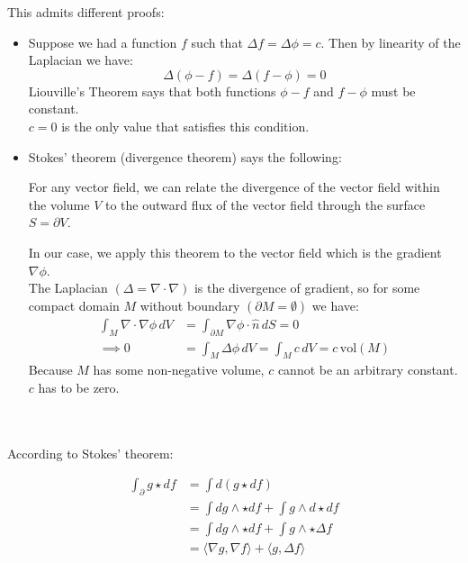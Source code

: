 \documentclass{article}
\def\grad{\nabla}
\def\lap{\Delta}
\begin{document}
This admits different proofs:
\begin{itemize}
    \item
        Suppose we had a function $f$ such that $\lap f = \lap \phi = c$. Then by linearity of the Laplacian we have:
        $$
            \lap (\phi - f) = \lap (f - \phi) = 0
        $$
        Liouville's Theorem says that both functions $\phi - f$ and $f - \phi$ must be constant.\\
        $c=0$ is the only value that satisfies this condition.

    \item
        Stokes' theorem (divergence theorem) says the following:
        \begin{mdframed}
            For any vector field, we 
            can relate the divergence of the vector field within the volume $V$ 
            to the outward flux of the vector field through the surface $S = \partial V$.
        \end{mdframed}
        In our case, we apply this theorem to the vector field which is the gradient $\grad \phi$.\\
        The Laplacian $(\lap = \grad \cdot \grad)$ is the divergence of gradient,
        so for some compact domain $M$ without boundary $(\partial M = \emptyset)$ we have:
        \begin{align*}
            \int_M \grad \cdot \grad \phi \,dV &= \int_{\partial M} \grad \phi \cdot \hat{n} \,dS = 0\\
            \implies 0 &= \int_M \lap \phi \,dV = \int_M c \,dV = c \,\text{vol}(M)
        \end{align*}
        Because $M$ has some non-negative volume, $c$ cannot be an arbitrary constant. $c$ has to be zero.
\end{itemize}


\pagebreak
{}\\\\




According to Stokes' theorem:

\begin{align*}
\int_\partial g \star df &= \int d(g \star df) \\
    &= \int dg \wedge \star df + \int g \wedge d \star df \\
    &= \int dg \wedge \star df + \int g \wedge \star  \lap f \\
    &= \langle \grad g, \grad f \rangle + \langle g, \lap f \rangle
\end{align*}
\end{document}
